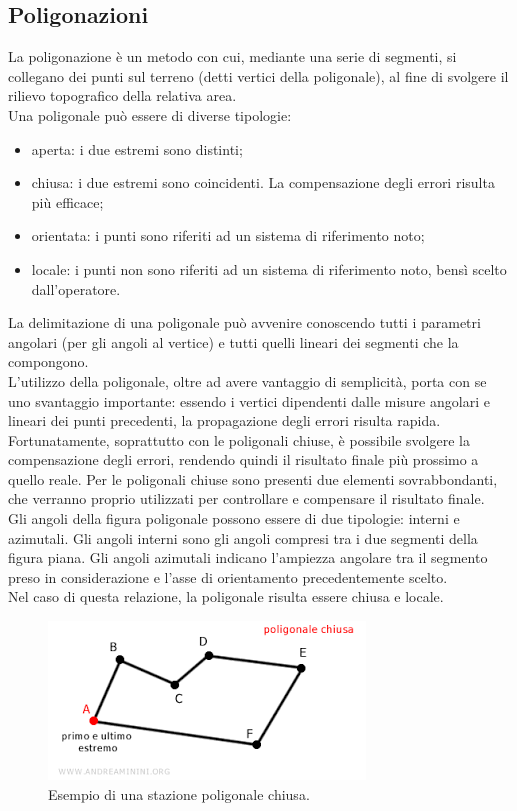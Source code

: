 \subsection{Poligonazioni}
La poligonazione è un metodo con cui, mediante una serie di segmenti, si collegano dei punti sul terreno (detti vertici della poligonale), al fine di svolgere il rilievo topografico della relativa area.\\
Una poligonale può essere di diverse tipologie:
\begin{itemize}
    \item aperta: i due estremi sono distinti;
    \item chiusa: i due estremi sono coincidenti. La compensazione degli errori risulta più efficace;
    \item orientata: i punti sono riferiti ad un sistema di riferimento noto;
    \item locale: i punti non sono riferiti ad un sistema di riferimento noto, bensì scelto dall'operatore.
\end{itemize}
La delimitazione di una poligonale può avvenire conoscendo tutti i parametri angolari (per gli angoli al vertice) e tutti quelli lineari dei segmenti che la compongono.\\
L'utilizzo della poligonale, oltre ad avere vantaggio di semplicità, porta con se uno svantaggio importante: essendo i vertici dipendenti dalle misure angolari e lineari dei punti precedenti, la propagazione degli errori risulta rapida.\\
Fortunatamente, soprattutto con le poligonali chiuse, è possibile svolgere la compensazione degli errori, rendendo quindi il risultato finale più prossimo a quello reale. Per le poligonali chiuse sono presenti due elementi sovrabbondanti, che verranno proprio utilizzati per controllare e compensare il risultato finale.\\
Gli angoli della figura poligonale possono essere di due tipologie: interni e azimutali. Gli angoli interni sono gli angoli compresi tra i due segmenti della figura piana. Gli angoli azimutali indicano l'ampiezza angolare tra il segmento preso in considerazione e l'asse di orientamento precedentemente scelto.\\
Nel caso di questa relazione, la poligonale risulta essere chiusa e locale.
\begin{figure}[H]
    \centering
    \includegraphics[width=0.5 \textwidth]{immagini/poligonale_chiusa.png}
    \caption{Esempio di una stazione poligonale chiusa.}
    \label{fig:poligonale_chiusa}
\end{figure}

